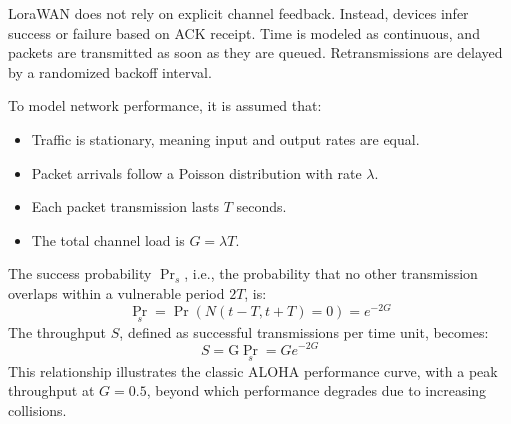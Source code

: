 LoraWAN does not rely on explicit channel feedback. 
Instead, devices infer success or failure based on ACK receipt. 
Time is modeled as continuous, and packets are transmitted as soon as they are queued. 
Retransmissions are delayed by a randomized backoff interval.

To model network performance, it is assumed that:
\begin{itemize}
    \item Traffic is stationary, meaning input and output rates are equal. 
    \item Packet arrivals follow a Poisson distribution with rate $\lambda$. 
    \item Each packet transmission lasts $T$ seconds.
    \item The total channel load is $G=\lambda T$.
\end{itemize}
\noindent The success probability $\Pr_s$, i.e., the probability that no other transmission overlaps within a vulnerable period $2T$, is:
\[\Pr_s=\Pr(N(t-T,t+T)=0)=e^{-2G}\]
\noindent The throughput $S$, defined as successful transmissions per time unit, becomes:
\[S=\text{G}\Pr_s=Ge^{-2G}\]
\noindent This relationship illustrates the classic ALOHA performance curve, with a peak throughput at $G=0.5$, beyond which performance degrades due to increasing collisions. 